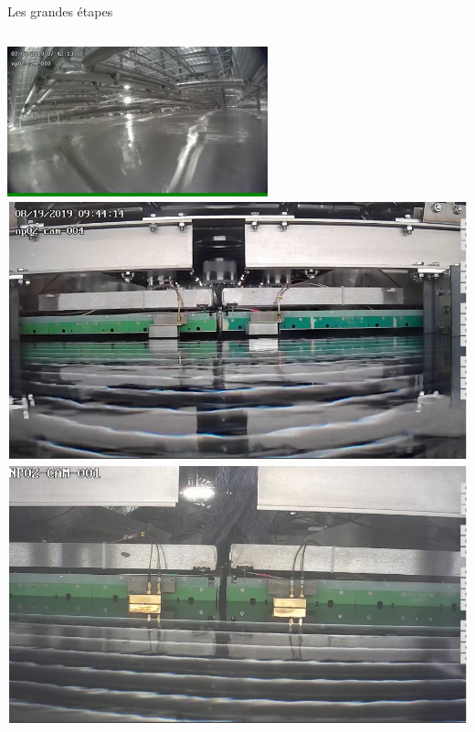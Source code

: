     \begin{frame}{Les grandes étapes}
        \begin{columns}
            \begin{column}{0.4\textwidth}
                \includegraphics[width=\textwidth]{./pictures/status_666.png}\\
                \includegraphics[width=\textwidth]{./pictures/crp_out_lar.png}\\
                \includegraphics[width=\textwidth]{./pictures/crp_in_lar.png}

\end{column}
\end{columns}
\end{frame}
